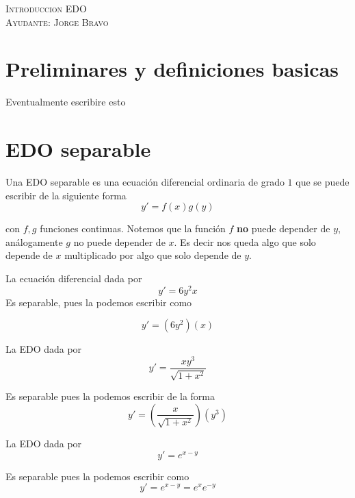 \documentclass[a4paper,oneside,10.5pt]{article}
\begin{document}
\begin{center}
{\Large \textsc{Introduccion EDO}}\\
\vspace{1em}
\textsc{Ayudante: Jorge Bravo}\\
\end{center}

\section*{Preliminares y definiciones basicas}
Eventualmente escribire esto

\section*{EDO separable}
Una EDO separable es una ecuación diferencial ordinaria de grado $1$ que se puede escribir de la siguiente forma
\begin{equation*}
y' = f(x)g(y)
\end{equation*}

con $f, g$ funciones continuas. Notemos que la función $f$ \textbf{no} puede depender de $y$, análogamente $g$ no puede depender de $x$. Es decir nos queda algo que solo depende de $x$ multiplicado por algo que solo depende de $y$.

\begin{ejemplo}
  La ecuación diferencial dada por
  \begin{equation*}
    y' = 6y^{2}x
  \end{equation*}
  Es separable, pues la podemos escribir como

  \begin{equation*}
    y' = (6y^{2})(x)
  \end{equation*}
\end{ejemplo}

\begin{ejemplo}
La EDO dada por
\begin{equation*}
y' = \frac{xy^{3}}{\sqrt{1+x^{2}}}
\end{equation*}

Es separable pues la podemos escribir de la forma
\begin{equation*}
y' = (\frac{x}{\sqrt{1+x^{2}}})(y^{3})
\end{equation*}
\end{ejemplo}

\begin{ejemplo}
  La EDO dada por
  \begin{equation*}
    y' = e^{x - y}
  \end{equation*}

  Es separable pues la podemos escribir como
  \begin{equation*}
    y' = e^{x - y} = e^{x}e^{-y}
  \end{equation*}
\end{ejemplo}
\end{document}

